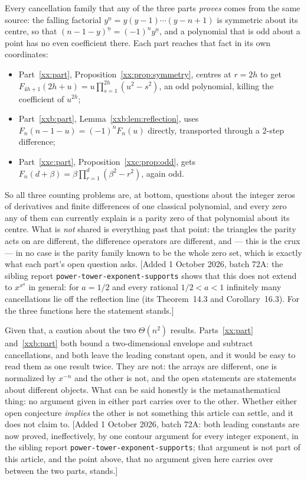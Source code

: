 \documentclass[11pt,a4paper]{article}
\numberwithin{equation}{section}
\theoremstyle{definition}
\theoremstyle{remark}
\theoremstyle{plain}
\newcommand{\fall}[2]{#1^{\underline{#2}}}
\newcommand{\sibPTE}{\texttt{power-\allowbreak{}tower-\allowbreak{}exponent-\allowbreak{}supports}}
\begin{document}
Every cancellation family that any of the three parts \emph{proves} comes from
the same source: the falling factorial $\fall{y}{n}=y(y-1)\cdots(y-n+1)$ is
symmetric about its centre, so that $\fall{(n-1-y)}{n}=(-1)^n\fall{y}{n}$, and a
polynomial that is odd about a point has no even coefficient there.  Each part
reaches that fact in its own coordinates:
\begin{itemize}[leftmargin=1.6em,itemsep=2pt]
\item Part~\ref{xx:part}, Proposition~\ref{xx:prop:symmetry}, centres at $r=2h$
 to get $F_{4h+1}(2h+u)=u\prod_{s=1}^{2h}(u^2-s^2)$, an odd polynomial, killing
 the coefficient of $u^{2h}$;
\item Part~\ref{xxb:part}, Lemma~\ref{xxb:lem:reflection}, uses
 $F_n(n-1-u)=(-1)^nF_n(u)$ directly, transported through a $2$-step difference;
\item Part~\ref{xxc:part}, Proposition~\ref{xxc:prop:odd}, gets
 $F_n(d+\beta)=\beta\prod_{r=1}^d(\beta^2-r^2)$, again odd.
\end{itemize}
So all three counting problems are, at bottom, questions about the integer zeros
of derivatives and finite differences of one classical polynomial, and every
zero any of them can currently explain is a parity zero of that polynomial about
its centre.  What is \emph{not} shared is everything past that point: the
triangles the parity acts on are different, the difference operators are
different, and --- this is the crux --- in no case is the parity family known to
be the whole zero set, which is exactly what each part's open question asks.
[Added 1 October 2026, batch 72A: the sibling report \sibPTE{} shows that this does
not extend to $x^{x^a}$ in general: for $a=1/2$ and every rational $1/2<a<1$
infinitely many cancellations lie off the reflection line (its Theorem~14.3 and
Corollary~16.3).  For the three functions here the statement stands.]

Given that, a caution about the two $\Theta(n^2)$ results.  Parts~\ref{xx:part}
and~\ref{xxb:part} both bound a two-dimensional envelope and subtract
cancellations, and both leave the leading constant open, and it would be easy to
read them as one result twice.  They are not: the arrays are different, one is
normalized by $x^{-n}$ and the other is not, and the open statements are
statements about different objects.  What can be said honestly is the
metamathematical thing: no argument given in either part carries over to the
other.  Whether either open conjecture \emph{implies} the other is not something
this article can settle, and it does not claim to.
[Added 1 October 2026, batch 72A: both leading constants are now proved, ineffectively, by
one contour argument for every integer exponent, in the sibling report
\sibPTE{}; that argument is not part of this article, and the point
above, that no argument given here carries over between the two parts, stands.]
\end{document}
